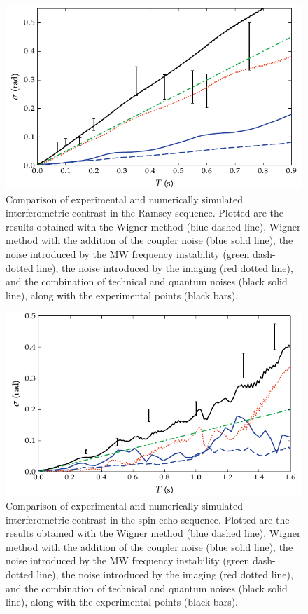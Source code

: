 \begin{figure}
    \centerline{\includegraphics{figures_generated/bec_noise/ramsey_noise.pdf}}

    \caption{Comparison of experimental and numerically simulated interferometric contrast in the Ramsey sequence.
    Plotted are the results obtained with the Wigner method (blue dashed line), Wigner method with the addition of the coupler noise (blue solid line), the noise introduced by the MW frequency instability (green dash-dotted line), the noise introduced by the imaging (red dotted line), and the combination of technical and quantum noises (black solid line), along with the experimental points (black bars).}

    \label{fig:bec-noise:phase-noise:ramsey-phnoise}
\end{figure}

\begin{figure}
    \centerline{\includegraphics{figures_generated/bec_noise/echo_noise.pdf}}

    \caption{Comparison of experimental and numerically simulated interferometric contrast in the spin echo sequence.
    Plotted are the results obtained with the Wigner method (blue dashed line), Wigner method with the addition of the coupler noise (blue solid line), the noise introduced by the MW frequency instability (green dash-dotted line), the noise introduced by the imaging (red dotted line), and the combination of technical and quantum noises (black solid line), along with the experimental points (black bars).}

    \label{fig:bec-noise:phase-noise:echo-phnoise}
\end{figure}
